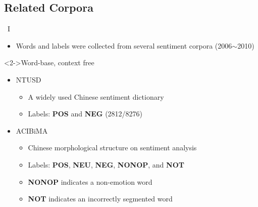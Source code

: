 \documentclass[compress]{beamer}
\begin{document}
    \subsection{Related Corpora}
        \begin{frame}{\subsecname\ I}
            \begin{itemize}
                \item<1-> Words and labels were collected from several sentiment corpora (2006$\sim$2010)
            \end{itemize}
            \begin{block}<2->{Word-base, context free}
                \begin{itemize}
                    \item<2-> NTUSD
                        \begin{itemize}
                            \item<3-> A widely used Chinese sentiment dictionary
                            \item<3-> Labels: \textbf{POS} and \textbf{NEG} (2812/8276) 
                        \end{itemize}
                    \item<2-> ACIBiMA
                        \begin{itemize}
                            \item<4-> Chinese morphological structure on sentiment analysis
                            \item<4-> Labels: \textbf{POS}, \textbf{NEU}, \textbf{NEG}, \textbf{NONOP}, and \textbf{NOT}
                            \item<5-> \textbf{NONOP} indicates a non-emotion word
                            \item<5-> \textbf{NOT} indicates an incorrectly segmented word
                        \end{itemize}
                \end{itemize}
            \end{block}
        \end{frame}
\end{document}
